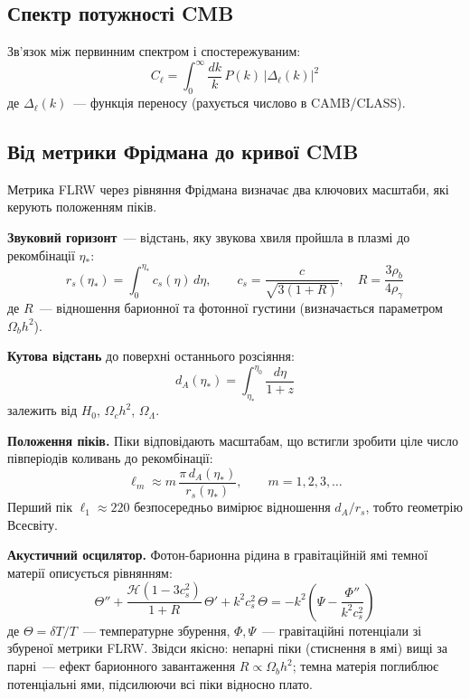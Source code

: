 \documentclass[12pt, a4paper]{article}
\begin{document}
\subsection{Спектр потужності CMB}

Зв'язок між первинним спектром і спостережуваним:
\begin{equation*}
  C_\ell = \int_0^\infty \frac{dk}{k}\, P(k)\,\bigl|\Delta_\ell(k)\bigr|^2
\end{equation*}
де $\Delta_\ell(k)$~--- функція переносу (рахується числово в CAMB/CLASS).

\subsection{Від метрики Фрідмана до кривої CMB}

Метрика FLRW через рівняння Фрідмана визначає два ключових масштаби,
які керують положенням піків.

\textbf{Звуковий горизонт}~--- відстань, яку звукова хвиля пройшла
в плазмі до рекомбінації $\eta_*$:
\begin{equation*}
  r_s(\eta_*) = \int_0^{\eta_*} c_s(\eta)\, d\eta,
  \qquad
  c_s = \frac{c}{\sqrt{3(1 + R)}},\quad
  R = \frac{3\rho_b}{4\rho_\gamma}
\end{equation*}
де $R$~--- відношення барионної та фотонної густини
(визначається параметром $\Omega_b h^2$).

\textbf{Кутова відстань} до поверхні останнього розсіяння:
\begin{equation*}
  d_A(\eta_*) = \int_{\eta_*}^{\eta_0} \frac{d\eta}{1+z}
\end{equation*}
залежить від $H_0$, $\Omega_c h^2$, $\Omega_\Lambda$.

\textbf{Положення піків.}
Піки відповідають масштабам, що встигли зробити ціле число
півперіодів коливань до рекомбінації:
\begin{equation*}
  \ell_m \approx m\,\frac{\pi\, d_A(\eta_*)}{r_s(\eta_*)},
  \qquad m = 1, 2, 3, \ldots
\end{equation*}
Перший пік $\ell_1 \approx 220$ безпосередньо вимірює відношення $d_A/r_s$,
тобто геометрію Всесвіту.

\textbf{Акустичний осцилятор.}
Фотон-барионна рідина в гравітаційній ямі темної матерії описується рівнянням:
\begin{equation*}
  \Theta'' + \frac{\mathcal{H}(1-3c_s^2)}{1+R}\,\Theta'
  + k^2 c_s^2\,\Theta
  = -k^2\!\left(\Psi - \frac{\Phi''}{k^2 c_s^2}\right)
\end{equation*}
де $\Theta = \delta T/T$~--- температурне збурення,
$\Phi, \Psi$~--- гравітаційні потенціали зі збуреної метрики FLRW.
Звідси якісно:
непарні піки (стиснення в ямі) вищі за парні~--- ефект барионного
завантаження $R \propto \Omega_b h^2$;
темна матерія поглиблює потенціальні ями, підсилюючи всі піки відносно плато.
\end{document}
